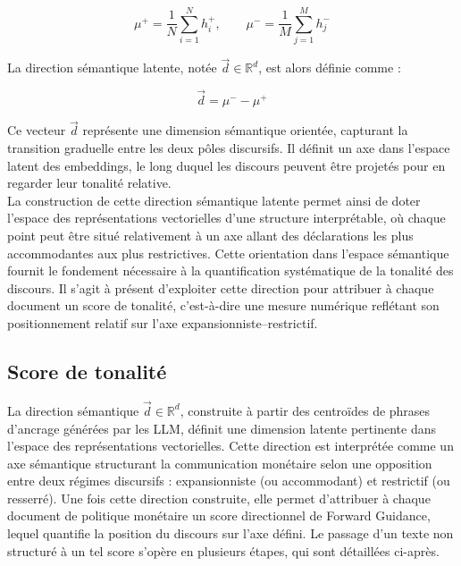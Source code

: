 \begin{equation}
\mu^{+} = \frac{1}{N} \sum_{i=1}^N h_i^{+}, \qquad \mu^{-} = \frac{1}{M} \sum_{j=1}^M h_j^{-}
\end{equation}

La direction sémantique latente, notée $\vec{d} \in \mathbb{R}^d$, est alors définie comme :

\begin{equation}
\vec{d} = \mu^{-} - \mu^{+}
\end{equation}

Ce vecteur $\vec{d}$ représente une dimension sémantique orientée, capturant la transition graduelle entre les deux pôles discursifs. Il définit un axe dans l’espace latent des embeddings, le long duquel les discours peuvent être projetés pour en regarder leur tonalité relative.\\

La construction de cette direction sémantique latente permet ainsi de doter l’espace des représentations vectorielles d’une structure interprétable, où chaque point peut être situé relativement à un axe allant des déclarations les plus accommodantes aux plus restrictives. Cette orientation dans l’espace sémantique fournit le fondement nécessaire à la quantification systématique de la tonalité des discours. Il s’agit à présent d’exploiter cette direction pour attribuer à chaque document un score de tonalité, c’est-à-dire une mesure numérique reflétant son positionnement relatif sur l’axe expansionniste–restrictif.

\subsection{Score de tonalité}

La direction sémantique $\vec{d} \in \mathbb{R}^d$, construite à partir des centroïdes de phrases d’ancrage générées par les LLM, définit une dimension latente pertinente dans l’espace des représentations vectorielles. Cette direction est interprétée comme un axe sémantique structurant la communication monétaire selon une opposition entre deux régimes discursifs : expansionniste (ou accommodant) et restrictif (ou resserré). Une fois cette direction construite, elle permet d’attribuer à chaque document de politique monétaire un score directionnel de Forward Guidance, lequel quantifie la position du discours sur l’axe défini. Le passage d’un texte non structuré à un tel score s’opère en plusieurs étapes, qui sont détaillées ci-après.\\

